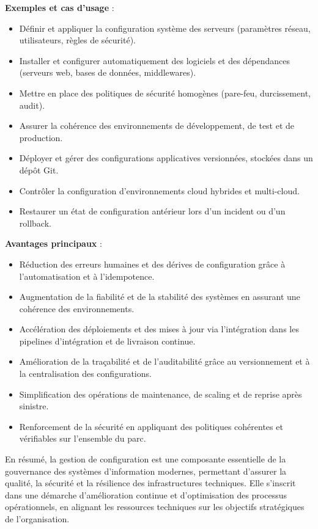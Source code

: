 \textbf{Exemples et cas d’usage} :
\begin{itemize}
	\item Définir et appliquer la configuration système des serveurs (paramètres réseau, utilisateurs, règles de sécurité).
	\item Installer et configurer automatiquement des logiciels et des dépendances (serveurs web, bases de données, middlewares).
	\item Mettre en place des politiques de sécurité homogènes (pare-feu, durcissement, audit).
	\item Assurer la cohérence des environnements de développement, de test et de production.
	\item Déployer et gérer des configurations applicatives versionnées, stockées dans un dépôt Git.
	\item Contrôler la configuration d’environnements cloud hybrides et multi-cloud.
	\item Restaurer un état de configuration antérieur lors d’un incident ou d’un rollback.
\end{itemize}

\textbf{Avantages principaux} :
\begin{itemize}
	\item Réduction des erreurs humaines et des dérives de configuration grâce à l’automatisation et à l’idempotence.
	\item Augmentation de la fiabilité et de la stabilité des systèmes en assurant une cohérence des environnements.
	\item Accélération des déploiements et des mises à jour via l’intégration dans les pipelines d’intégration et de livraison continue.
	\item Amélioration de la traçabilité et de l’auditabilité grâce au versionnement et à la centralisation des configurations.
	\item Simplification des opérations de maintenance, de scaling et de reprise après sinistre.
	\item Renforcement de la sécurité en appliquant des politiques cohérentes et vérifiables sur l’ensemble du parc.
\end{itemize}

En résumé, la gestion de configuration est une composante essentielle de la gouvernance des systèmes d’information modernes, permettant d’assurer la qualité, la sécurité et la résilience des infrastructures techniques. Elle s’inscrit dans une démarche d’amélioration continue et d’optimisation des processus opérationnels, en alignant les ressources techniques sur les objectifs stratégiques de l’organisation.


